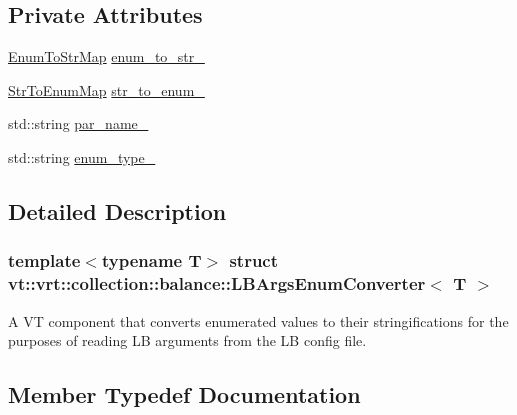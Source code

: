 \subsection*{Private Attributes}
\begin{DoxyCompactItemize}
\item 
\hyperlink{structvt_1_1vrt_1_1collection_1_1balance_1_1_l_b_args_enum_converter_ab4e2b0c525c1ea76f18f2ff45733f3c4}{Enum\+To\+Str\+Map} \hyperlink{structvt_1_1vrt_1_1collection_1_1balance_1_1_l_b_args_enum_converter_ab4c64192522847d62019adb796824da3}{enum\+\_\+to\+\_\+str\+\_\+}
\item 
\hyperlink{structvt_1_1vrt_1_1collection_1_1balance_1_1_l_b_args_enum_converter_a4addf8d7b128d0e5de627e60b4c299bf}{Str\+To\+Enum\+Map} \hyperlink{structvt_1_1vrt_1_1collection_1_1balance_1_1_l_b_args_enum_converter_aae1662ab7a78192d215aa616fac03de6}{str\+\_\+to\+\_\+enum\+\_\+}
\item 
std\+::string \hyperlink{structvt_1_1vrt_1_1collection_1_1balance_1_1_l_b_args_enum_converter_a3e7e8c3f195b637ca0286405d5f64e67}{par\+\_\+name\+\_\+}
\item 
std\+::string \hyperlink{structvt_1_1vrt_1_1collection_1_1balance_1_1_l_b_args_enum_converter_a5e0b1ba18d8083c384c281f0a08567e9}{enum\+\_\+type\+\_\+}
\end{DoxyCompactItemize}


\subsection{Detailed Description}
\subsubsection*{template$<$typename T$>$\newline
struct vt\+::vrt\+::collection\+::balance\+::\+L\+B\+Args\+Enum\+Converter$<$ T $>$}

A VT component that converts enumerated values to their stringifications for the purposes of reading LB arguments from the LB config file. 

\subsection{Member Typedef Documentation}
\mbox{\label{structvt_1_1vrt_1_1collection_1_1balance_1_1_l_b_args_enum_converter_ab4e2b0c525c1ea76f18f2ff45733f3c4}} 
